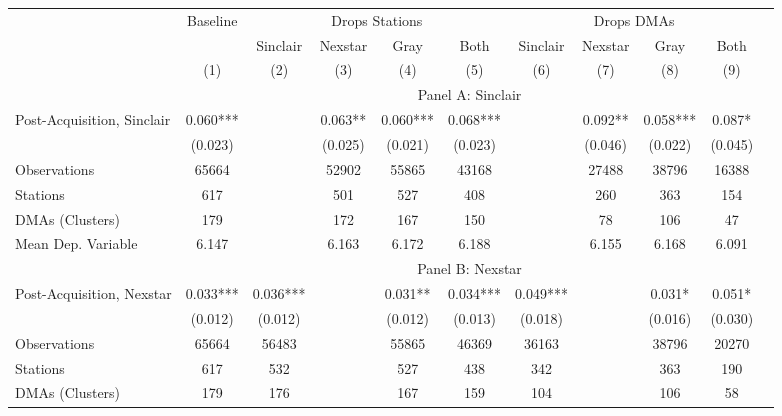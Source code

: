 {\def \sym#1{\ifmmode^{#1}\else\(^{#1}\)\fi} \begin{tabular}{l*{10}{c}} \toprule \ & \multicolumn{1}{c}{Baseline} & \multicolumn{4}{c}{Drops Stations}   & \multicolumn{4}{c}{Drops DMAs} \\ \cmidrule(lr){2-2}\cmidrule(lr){3-6}\cmidrule(lr){7-10} \ & 
 & Sinclair & Nexstar & Gray & Both & Sinclair & Nexstar & Gray & Both \\  \ & (1) & (2) & (3) & (4) & (5) & (6)  & (7)  & (8)  & (9) \\
\midrule \ & \multicolumn{9}{c}{Panel A: Sinclair} \\\cmidrule(lr){2-10}
Post-Acquisition, Sinclair&    0.060***&         &    0.063** &    0.060***&    0.068***&         &    0.092** &    0.058***&    0.087*  \\
                &  (0.023)   &         &  (0.025)   &  (0.021)   &  (0.023)   &         &  (0.046)   &  (0.022)   &  (0.045)   \\
\midrule
Observations    &    65664   &         &    52902   &    55865   &    43168   &         &    27488   &    38796   &    16388   \\
Stations        &      617   &         &      501   &      527   &      408   &         &      260   &      363   &      154   \\
DMAs (Clusters) &      179   &         &      172   &      167   &      150   &         &       78   &      106   &       47   \\
Mean Dep. Variable&    6.147   &         &    6.163   &    6.172   &    6.188   &         &    6.155   &    6.168   &    6.091   \\
\midrule \ & \multicolumn{9}{c}{Panel B: Nexstar} \\\cmidrule(lr){2-10}
Post-Acquisition, Nexstar&    0.033***&    0.036***&         &    0.031** &    0.034***&    0.049***&         &    0.031*  &    0.051*  \\
                &  (0.012)   &  (0.012)   &         &  (0.012)   &  (0.013)   &  (0.018)   &         &  (0.016)   &  (0.030)   \\
\midrule
Observations    &    65664   &    56483   &         &    55865   &    46369   &    36163   &         &    38796   &    20270   \\
Stations        &      617   &      532   &         &      527   &      438   &      342   &         &      363   &      190   \\
DMAs (Clusters) &      179   &      176   &         &      167   &      159   &      104   &         &      106   &       58   \\

\end{tabular}}
